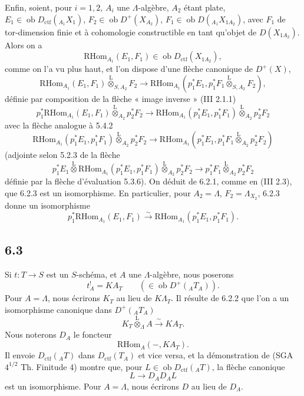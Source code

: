 \documentclass[11pt]{article}
\providecommand{\RHom}{\mathrm{RHom}}
\providecommand{\lten}{\overset{\mathrm L}{\otimes}}
\providecommand{\Ob}{\operatorname{ob}}
\providecommand{\RHom}{\mathrm{RHom}}
\providecommand{\lten}{\overset{\mathrm L}{\otimes}}
\providecommand{\RHom}{\mathrm R\mathcal{H}om}
\providecommand{\lten}{\overset{\mathrm L}{\otimes}}
\providecommand{\Ob}{\operatorname{ob}}
\providecommand{\lten}{\overset{\mathrm L}{\otimes}}
\providecommand{\lten}{\overset{\mathrm L}{\otimes}}
\providecommand{\Ob}{\operatorname{Ob}}
\providecommand{\lten}{\overset{\mathrm L}{\otimes}}
\begin{document}
Enfin, soient, pour $i=1,2$, $A_i$ une $\Lambda$-algèbre, $A_2$ étant plate, $E_1\in\Ob D_{\mathrm{ctf}}({}_{A_1}X_1)$, $F_2\in\Ob D^+(X_{A_2})$, $F_1\in\Ob D({}_{A_1}X_{1A_2})$, avec $F_1$ de tor-dimension finie et à cohomologie constructible en tant qu'objet de $D(X_{1A_2})$. Alors on a
\[
\RHom_{A_1}(E_1,F_1)\in\Ob D_{\mathrm{ctf}}(X_{1A_2}),
\]
comme on l'a vu plus haut, et l'on dispose d'une flèche canonique de $D^+(X)$,
\begin{equation}
\RHom_{A_1}(E_1,F_1)\lten_{S,A_2}F_2
\longrightarrow
\RHom_{A_1}(p_1^*E_1,p_1^*F_1\lten_{S,A_2}F_2),
\tag{6.2.3}
\end{equation}
définie par composition de la flèche « image inverse » (III 2.1.1)
\[
p_1^*\RHom_{A_1}(E_1,F_1)\lten_{A_2}p_2^*F_2
\longrightarrow
\RHom_{A_1}(p_1^*E_1,p_1^*F_1)\lten_{A_2}p_2^*F_2
\]
avec la flèche analogue à 5.4.2
\[
\RHom_{A_1}(p_1^*E_1,p_1^*F_1)\lten_{A_2}p_2^*F_2
\longrightarrow
\RHom_{A_1}(p_1^*E_1,p_1^*F_1\lten_{A_2}p_2^*F_2)
\]
(adjointe selon 5.2.3 de la flèche
\[
p_1^*E_1\lten\RHom_{A_1}(p_1^*E_1,p_1^*F_1)\lten_{A_2}p_2^*F_2
\longrightarrow
p_1^*F_1\lten_{A_2}p_2^*F_2
\]
définie par la flèche d'évaluation 5.3.6). On déduit de 6.2.1, comme en (III 2.3), que 6.2.3 est un isomorphisme. En particulier, pour $A_2=\Lambda$, $F_2=\Lambda_{X_2}$, 6.2.3 donne un isomorphisme
\begin{equation}
p_1^*\RHom_{A_1}(E_1,F_1)
\xrightarrow{\sim}
\RHom_{A_1}(p_1^*E_1,p_1^*F_1).
\tag{6.2.4}
\end{equation}

\subsection*{6.3}
Si $t:T\to S$ est un $S$-schéma, et $A$ une $\Lambda$-algèbre, nous poserons
\begin{equation}
t_A^! = KA_T \qquad(\in\Ob D^+({}_AT_A)).
\tag{6.3.1}
\end{equation}
Pour $A=\Lambda$, nous écrirons $K_T$ au lieu de $K\Lambda_T$. Il résulte de 6.2.2 que l'on a un isomorphisme canonique dans $D^+({}_AT_A)$
\begin{equation}
K_T\lten_{\Lambda}A\xrightarrow{\sim}KA_T.
\tag{6.3.2}
\end{equation}
Nous noterons $D_A$ le foncteur
\[
\RHom_A(-,KA_T).
\]
Il envoie $D_{\mathrm{ctf}}({}_AT)$ dans $D_{\mathrm{ctf}}(T_A)$ et vice versa, et la démonstration de (SGA $4^{1/2}$ Th. Finitude 4) montre que, pour $L\in\Ob D_{\mathrm{ctf}}({}_AT)$, la flèche canonique
\[
L\longrightarrow D_AD_AL
\]
est un isomorphisme. Pour $A=\Lambda$, nous écrirons $D$ au lieu de $D_A$.
\end{document}
